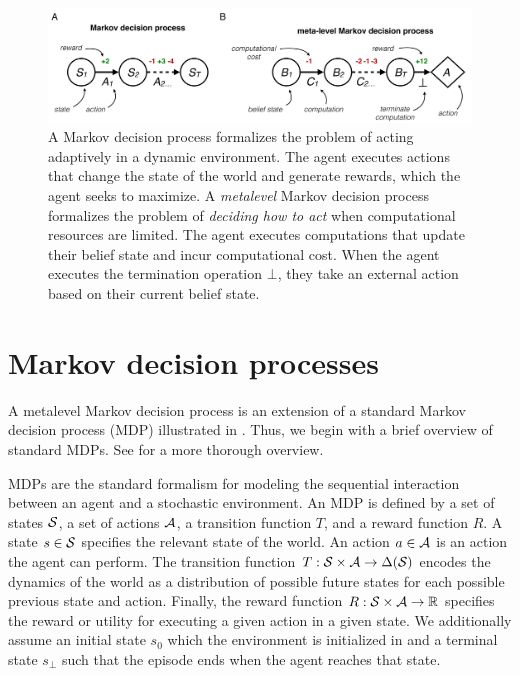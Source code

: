 

\begin{figure}
  \includegraphics[width=\textwidth]{figs/metamdp.pdf}
  \caption{
   A Markov decision process formalizes the problem of acting adaptively in a dynamic environment. The agent executes actions that change the state of the world and generate rewards, which the agent seeks to maximize.
   A \emph{metalevel} Markov decision process formalizes the problem of \emph{deciding how to act} when computational resources are limited. The agent executes computations that update their belief state and incur computational cost. When the agent executes the termination operation $\bot$, they take an external action based on their current belief state.}
  \label{fig:metamdp-diagram}
\end{figure}


\section{Markov decision processes}

A metalevel Markov decision process is an extension of a standard Markov decision process (MDP) illustrated in . Thus, we begin with a brief overview of standard MDPs. See \citet{sutton2018reinforcement} for a more thorough overview.

MDPs are the standard formalism for modeling the sequential interaction between an agent and a stochastic environment. An MDP is defined by a set of states $\S$, a set of actions $\A$, a transition function $T$, and a reward function $R$. A state $s \in \S$ specifies the relevant state of the world. An action $a \in \A$ is an action the agent can perform. The transition function $T: \S \times \A \rightarrow \Delta(\S)$\footnotemark{} encodes the dynamics of the world as a distribution of possible future states for each possible previous state and action. Finally, the reward function $R: \S \times \A \rightarrow \R $ specifies the reward or utility for executing a given action in a given state. We additionally assume an initial state $s_0$ which the environment is initialized in and a terminal state $s_\bot$ such that the episode ends when the agent reaches that state.

